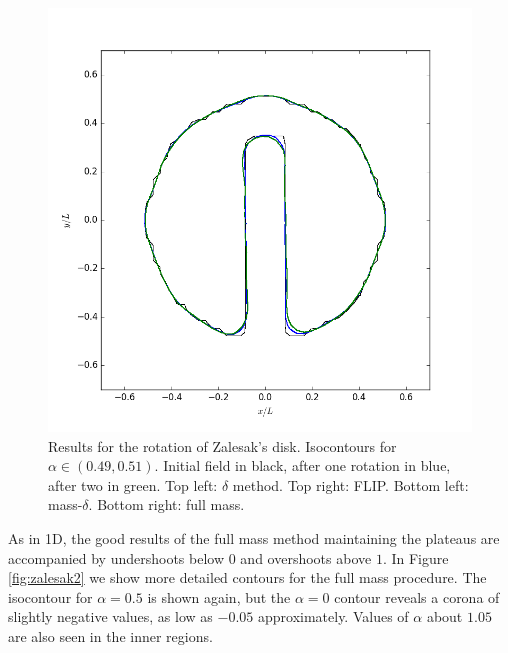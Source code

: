 \documentclass{ws-ijcm}
\begin{document}
\begin{figure}
\begin{minipage}{0.45\textwidth}
  \end{minipage}
  \quad
  \begin{minipage}{0.45\textwidth}
      \includegraphics[width=\textwidth]{contours_full_full}
  \end{minipage}
  \caption{Results for the rotation of Zalesak's disk.  Isocontours for
  $\alpha \in ( 0.49 , 0.51 )$. Initial field in black, after one
  rotation in blue, after two in green. Top left: $\delta$ method. Top
  right: FLIP. Bottom left: mass-$\delta$. Bottom right: full mass.
  \label{fig:zalesak}}
\end{figure}

As in 1D, the good results of the full mass method maintaining the
plateaus are accompanied by undershoots below $0$ and overshoots above
$1$. In Figure \ref{fig:zalesak2} we show more detailed contours for
the full mass procedure.  The isocontour for $\alpha=0.5$ is shown
again, but the $\alpha=0$ contour reveals a corona of slightly
negative values, as low as $-0.05$ approximately.  Values of $\alpha$
about $1.05$ are also seen in the inner regions.
\end{document}
